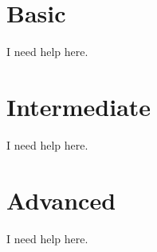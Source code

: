 \section{Basic}

I need help here.

\section{Intermediate}

I need help here.

\section{Advanced}

I need help here.


